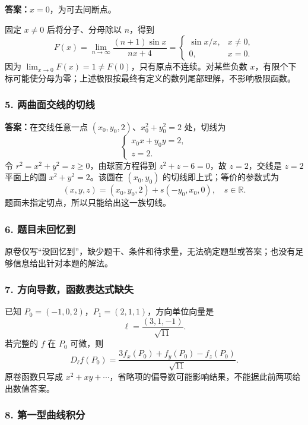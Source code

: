 \documentclass[11pt,fontset=fandol]{ctexart}
\begin{document}
\textbf{答案：}\(x=0\)，为可去间断点。

固定 \(x\ne0\) 后将分子、分母除以 \(n\)，得到 \[
F(x)=\lim_{n\to\infty}\frac{(n+1)\sin x}{nx+4}
=\begin{cases}\sin x/x,&x\ne0,\\0,&x=0.\end{cases}
\] 因为 \(\lim_{x\to0}F(x)=1\ne F(0)\)，只有原点不连续。对某些负数
\(x\)，有限个下标可能使分母为零；上述极限按最终有定义的数列尾部理解，不影响极限函数。

\subsubsection{5.
两曲面交线的切线}\label{ux4e24ux66f2ux9762ux4ea4ux7ebfux7684ux5207ux7ebf}

\textbf{答案：}在交线任意一点 \((x_0,y_0,2)\)、\(x_0^2+y_0^2=2\)
处，切线为 \[
\boxed{\begin{cases}x_0x+y_0y=2,\\z=2.\end{cases}}
\] 令 \(r^2=x^2+y^2=z\ge0\)，由球面方程得到 \(z^2+z-6=0\)，故
\(z=2\)，交线是 \(z=2\) 平面上的圆 \(x^2+y^2=2\)。该圆在 \((x_0,y_0)\)
的切线即上式；等价的参数式为 \[
(x,y,z)=(x_0,y_0,2)+s(-y_0,x_0,0),\quad s\in\mathbb R.
\] 题面未指定切点，所以只能给出这一族切线。

\subsubsection{6.
题目未回忆到}\label{ux9898ux76eeux672aux56deux5fc6ux5230}

原卷仅写``没回忆到''，缺少题干、条件和待求量，无法确定题型或答案；也没有足够信息给出针对本题的解法。

\subsubsection{7.
方向导数，函数表达式缺失}\label{ux65b9ux5411ux5bfcux6570ux51fdux6570ux8868ux8fbeux5f0fux7f3aux5931}

已知 \(P_0=(-1,0,2)\)，\(P_1=(2,1,1)\)，方向单位向量是 \[
\boldsymbol\ell=\frac{(3,1,-1)}{\sqrt{11}}.
\] 若完整的 \(f\) 在 \(P_0\) 可微，则 \[
D_{\boldsymbol\ell}f(P_0)
=\frac{3f_x(P_0)+f_y(P_0)-f_z(P_0)}{\sqrt{11}}.
\] 原卷函数只写成
\(x^2+xy+\cdots\)，省略项的偏导数可能影响结果，不能据此前两项给出数值答案。

\subsubsection{8.
第一型曲线积分}\label{ux7b2cux4e00ux578bux66f2ux7ebfux79efux5206}
\end{document}
